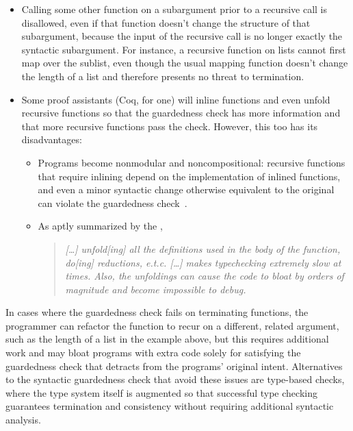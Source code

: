 \begin{itemize}
  \item Calling some other function on a subargument prior to a recursive call is disallowed,
    even if that function doesn't change the structure of that subargument,
    because the input of the recursive call is no longer exactly the syntactic subargument.
    For instance, a recursive function on lists cannot first map over the sublist,
    even though the usual mapping function doesn't change the length of a list
    and therefore presents no threat to termination.
  \item Some proof assistants (Coq, for one) will inline functions and even unfold recursive functions
    so that the guardedness check has more information
    and that more recursive functions pass the check.
    However, this too has its disadvantages:
    \begin{itemize}
      \item Programs become nonmodular and noncompositional:
        recursive functions that require inlining
        depend on the implementation of inlined functions,
        and even a minor syntactic change otherwise equivalent to the original
        can violate the guardedness check~\citep{CIC-hat-minus}.
      \item As aptly summarized by the \citet{coqterm},
        \begin{quote}
        \begin{singlespace}
        \textit{{\rm [\ldots]} unfold{\rm [ing]} all the definitions used in the body of the function, do{\rm [ing]} reductions, e.t.c.
        {\rm [\ldots]} makes typechecking extremely slow at times.
        Also, the unfoldings can cause the code to bloat by orders of magnitude and become impossible to debug.}
        \end{singlespace}
        \end{quote}
    \end{itemize}
\end{itemize}

In cases where the guardedness check fails on terminating functions,
the programmer can refactor the function to recur on a different, related argument,
such as the length of a list in the example above,
but this requires additional work and may bloat programs
with extra code solely for satisfying the guardedness check
that detracts from the programs' original intent.
Alternatives to the syntactic guardedness check that avoid these issues are type-based checks,
where the type system itself is augmented so that successful type checking
guarantees termination and consistency without requiring additional syntactic analysis.

